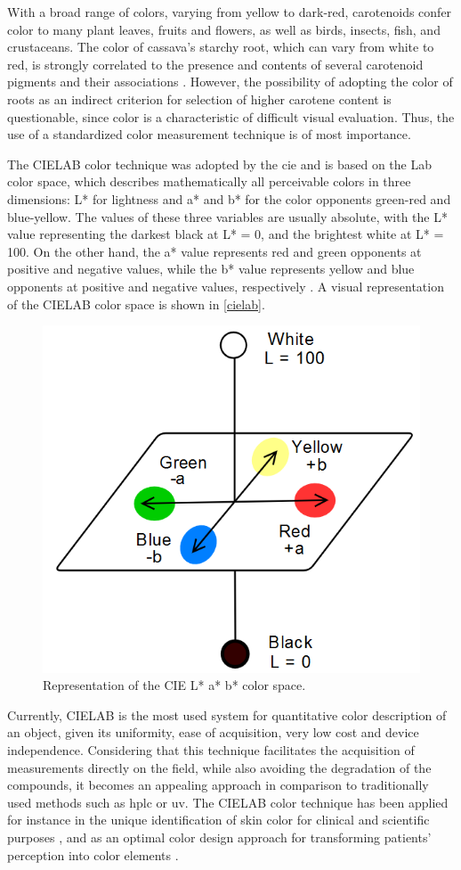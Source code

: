 With a broad range of colors, varying from yellow to dark-red, carotenoids confer color to many plant leaves, fruits and flowers, as well as birds, insects, fish, and crustaceans. The color of cassava's starchy root, which can vary from white to red, is strongly correlated to the presence and contents of several carotenoid pigments and their associations \citep{sanchez2006reduction}. However, the possibility of adopting the color of roots as an indirect criterion for selection of higher carotene content is questionable, since color is a characteristic of difficult visual evaluation. Thus, the use of a standardized color measurement technique is of most importance.

The CIELAB color technique was adopted by the \gls{cie} and is based on the Lab color space, which describes mathematically all perceivable colors in three dimensions: L* for lightness and a* and b* for the color opponents green-red and blue-yellow. The values of these three variables are usually absolute, with the L* value representing the darkest black at L* = 0, and the brightest white at L* = 100. On the other hand, the a* value represents red and green opponents at positive and negative values, while the b* value represents yellow and blue opponents at positive and negative values, respectively \citep{brockes1982evaluation, schanda2007colorimetry}. A visual representation of the CIELAB color space is shown in \autoref{cielab}.

\begin{figure}[h]
	\centering
	\includegraphics[width=0.4\linewidth]{Imagens/Case_study/cielab}
	\caption{Representation of the CIE L* a* b* color space.}
	\label{cielab}
\end{figure}

Currently, CIELAB is the most used system for quantitative color description of an object, given its uniformity, ease of acquisition, very low cost and device independence. Considering that this technique facilitates the acquisition of measurements directly on the field, while also avoiding the degradation of the compounds, it becomes an appealing approach in comparison to traditionally used methods such as \gls{hplc} or \gls{uv}. The CIELAB color technique has been applied for instance in the unique identification of skin color for clinical and scientific purposes \citep{weatherall1992skin}, and as an optimal color design approach for transforming patients' perception into color elements \citep{liu2014optimal}.

